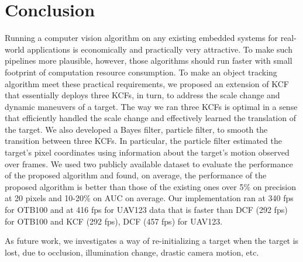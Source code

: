 \documentclass{bmvc2k}
\begin{document}
\section{Conclusion} \label{sc:Conclusion}
Running a computer vision algorithm on any existing embedded systems
for real-world applications is economically and practically very
attractive. To make such pipelines more plausible, however, those
algorithms should run faster with small footprint of computation
resource consumption. To make an object tracking algorithm meet these
practical requirements, we proposed an extension of KCF that
essentially deploys three KCFs, in turn, to address the scale change
and dynamic maneuvers of a target. The way we ran three KCFs is
optimal in a sense that efficiently handled the scale change and
effectively learned the translation of the target. We also developed a
Bayes filter, particle filter, to smooth the transition between three
KCFs. In particular, the particle filter estimated the target's pixel
coordinates using information about the target's motion observed over
frames. We used two publicly available dataset to evaluate the
performance of the proposed algorithm and found, on average, the
performance of the proposed algorithm is better than those of the
existing ones over 5\% on precision at 20 pixels and 10-20\% on AUC on
average. Our implementation ran at 340 fps for OTB100 and at 416 fps
for UAV123 data that is faster than DCF (292 fps) for OTB100 and KCF
(292 fps), DCF (457 fps) for UAV123.

As future work, we investigates a way of re-initializing a target when
the target is lost, due to occlusion, illumination change, drastic
camera motion, etc.


\end{document}

